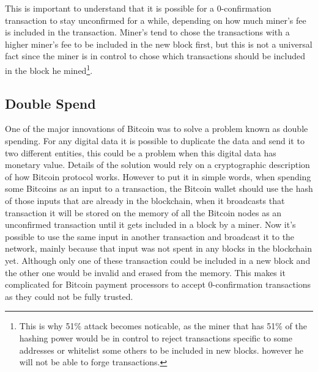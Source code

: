 This is important to understand that it is possible for a 0-confirmation transaction to stay unconfirmed for a while, depending on how much miner's fee is included in the transaction. Miner's tend to chose the transactions with a higher miner's fee to be included in the new block first, but this is not a universal fact since the miner is in control to chose which transactions should be included in the block he mined\footnote{This is why 51\% attack becomes noticable, as the miner that has 51\% of the hashing power would be in control to reject transactions specific to some addresses or whitelist some others to be included in new blocks. however he will not be able to forge transactions.}.

\subsection{Double Spend}
One of the major innovations of Bitcoin was to solve a problem known as double spending. For any digital data it is possible to duplicate the data and send it to two different entities, this could be a problem when this digital data has monetary value. Details of the solution would rely on a cryptographic description of how Bitcoin protocol works. However to put it in simple words, when spending some Bitcoins as an input to a transaction, the Bitcoin wallet should use the hash of those inputs that are already in the blockchain, when it broadcasts that transaction it will be stored on the memory of all the Bitcoin nodes as an unconfirmed transaction until it gets included in a block by a miner. Now it's possible to use the same input in another transaction and broadcast it to the network, mainly because that input was not spent in any blocks in the blockchain yet. Although only one of these transaction could be included in a new block and the other one would be invalid and erased from the memory. This makes it complicated for Bitcoin payment processors to accept 0-confirmation transactions as they could not be fully trusted. 




